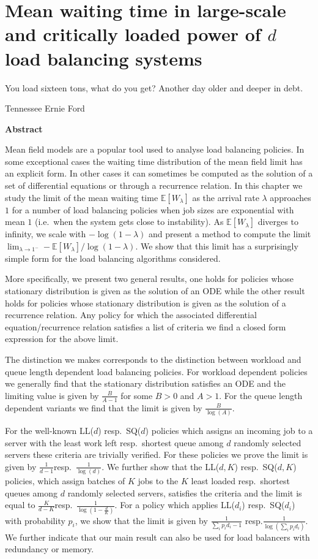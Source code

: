 \documentclass[12pt]{report}
\newcommand{\E}{\mathbb{E}}
\newenvironment{chapabstract}{%
    \begin{center}%
      \bfseries Abstract
    \end{center}}%
   {\par}
\begin{document}
\chapter{Mean waiting time in large-scale and critically loaded power of $d$ load balancing systems} \label{chap:heavy_traffic}
\epigraph{You load sixteen tons, what do you get? Another day older and deeper in debt.}{Tennessee Ernie Ford}
\begin{chapabstract}
Mean field models are a popular tool used to analyse load balancing policies. In some exceptional cases the waiting time distribution of the mean field limit has an explicit form. In other cases it can sometimes be computed as the solution of a set of differential equations or through a recurrence relation. In this chapter we study the limit of the mean waiting time $\E[W_\lambda]$ as the arrival rate $\lambda$ approaches $1$ 
for a number of load balancing policies when job sizes are exponential with
mean $1$ (i.e.~when the system gets close to instability). As $\E[W_\lambda]$ diverges to infinity, we scale with $-\log(1-\lambda)$ and present a method to compute the limit $\lim_{\lambda\rightarrow 1^-}-\E[W_\lambda]/\log(1-\lambda)$. We
show that this limit has a surprisingly simple form for the load balancing algorithms
considered. 

More specifically, we present two general results, one holds for policies whose stationary distribution is given as the solution of an ODE while the other result holds for policies whose stationary distribution is given as the solution of a recurrence relation. Any policy for which the associated differential equation/recurrence relation satisfies a list of criteria we find a closed form expression for the above limit.

The distinction we makes corresponds to the distinction between workload and queue length dependent load balancing policies. For workload dependent policies we generally find that the stationary distribution satisfies an ODE and the limiting value is given by $\frac{B}{A-1}$ for some $B>0$ and $A > 1$. For the queue length dependent variants we find that the limit is given by $\frac{B}{\log(A)}$.

 For the well-known LL($d$) resp.~SQ($d$) policies which assigns an incoming job to a server with the least work left resp.~shortest queue among $d$ randomly
selected servers these criteria are trivially verified. For these policies we prove the limit is given by $\frac{1}{d-1}$resp.~$\frac{1}{\log(d)}$. We further show that the LL($d,K$) resp.~SQ($d,K$) policies,
which assign batches of $K$ jobs to the $K$ least loaded resp.~shortest queues among $d$ randomly selected servers,  
satisfies the criteria and the limit is equal to $\frac{K}{d-K}$resp.~$\frac{1}{\log(1-\frac{d}{K})}$. For a policy which applies LL($d_i$) resp.~SQ($d_i$) with probability $p_i$, we show that the limit is given by $\frac{1}{\sum_i p_i d_i - 1}$ resp.$\frac{1}{\log\left(\sum_i p_i d_i\right)}$. We further indicate that our main result can also be used for load balancers with redundancy or memory.


\end{chapabstract}
\end{document}
